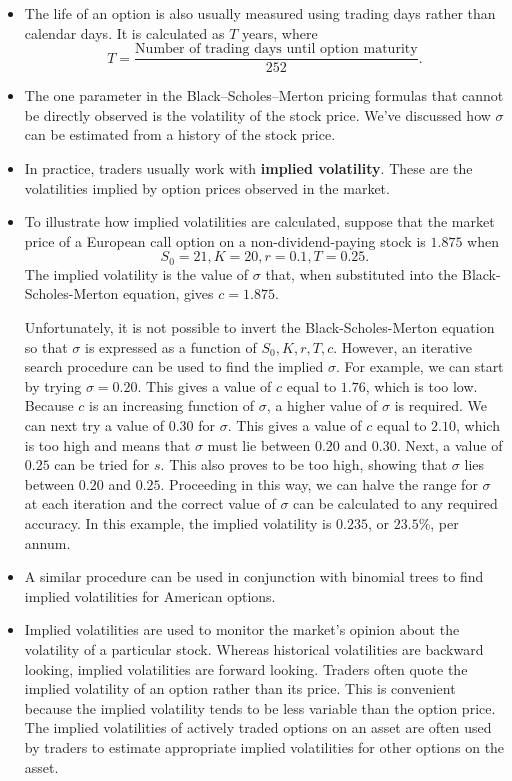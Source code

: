 \documentclass[letterpaper,10pt]{article}
\begin{document}
\begin{itemize}
 \item The life of an option is also usually measured using trading days rather than calendar
days. It is calculated as $T$ years, where $$T=\frac{\text{Number of trading days until option maturity}}{252}.$$
 

\item The one parameter in the Black–Scholes–Merton pricing formulas that cannot be directly observed is the volatility of the stock price. We've discussed how $\sigma$ can be estimated from a history of the stock price.

\item  In practice, traders usually work with {\bf implied volatility}. These are the volatilities implied by option prices observed in the market.  

\item To illustrate how implied volatilities are calculated, suppose that the market price of a European call option on a non-dividend-paying stock is $1.875$ when $$S_0 = 21, K = 20, r = 0.1, T = 0.25.$$ The implied volatility is the value of $\sigma$ that, when substituted into the Black-Scholes-Merton equation, gives $c = 1.875$. 

Unfortunately, it is not possible to invert the Black-Scholes-Merton equation so that $\sigma$ is expressed as a function of $S_0, K, r, T, c$. However, an iterative search procedure can be used to find the implied $\sigma$. For example, we can start by trying $\sigma = 0.20.$ This gives a value of $c$ equal to $1.76$, which is too low. Because $c$ is an increasing function of $\sigma$, a higher value of $\sigma$ is required. We can next try a value of $0.30$ for $\sigma$. This gives a value of $c$ equal to $2.10$, which is too high and means that $\sigma$ must lie between $0.20$ and $0.30$. Next, a value of $0.25$ can be tried for $s$. This also proves to be too high, showing that $\sigma$ lies between $0.20$ and $0.25$. Proceeding in this way, we can halve the range for $\sigma$ at each iteration and the correct value of $\sigma$ can be calculated to any required accuracy. In this example, the implied volatility is $0.235$, or $23.5\%$, per annum. 

\item A similar procedure can be used in conjunction with binomial trees to find implied volatilities for American options.

\item Implied volatilities are used to monitor the market’s opinion about the volatility of a particular stock. Whereas historical volatilities are backward looking, implied volatilities are forward looking. Traders often quote the implied volatility of an option rather than its price. This is convenient because the implied volatility tends to be less variable than the option price. The implied volatilities of actively traded options on an asset are often used by traders to estimate appropriate implied volatilities for other options on the asset.


\end{itemize}
\end{document}
